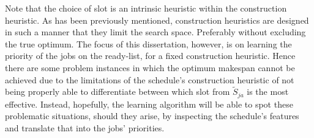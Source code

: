 \begin{comment} %
Preliminary experiments which at each time step all jobs on the ready-list are explored and dispatched according to a (fixed) construction heuristic. The job corresponding to the best resulting makespan (found via analytical methods) is chosen to have the highest priority. The resulting makespan is divided by its theoretical optimal makespan, i.e., the deviation from optimality defined by \cref{eq:ratio}. A histogram for 6-job 5-machine \jsp\ problem instances ($N=500$) is depicted in \cref{fig:slot:smallestvsfirst} using both the intrinsic heuristics: (\subref{fig:slot:first}) first slot chosen and (\subref{fig:slot:small}) slot corresponding to the smallest slot size chosen. Using always the first slot, roughly 26\% of the instances were able to achieve the optimum makespan, however mere 16\% using the smallest slot size. Hence dispatching in the first slot was favoured and will be used throughout the study.
\begin{figure}
\subfloat[First slot]{\texttt{[image: slotsize\_first.eps]}} %
\subfloat[Smallest slot size]{\texttt{[image: slotsize\_small.eps]}} %
\caption{Histogram of deviation from optimality by sequentially dispatching optimal jobs using a fixed construction heuristic.}
\label{fig:slot:smallestvsfirst}
\end{figure}
\end{comment}

Note that the choice of slot is an intrinsic heuristic within the construction heuristic. As has been previously mentioned, construction heuristics are designed in such a manner that they limit the search space. Preferably without excluding the true optimum. The focus of this dissertation, however, is on learning the priority of the jobs on the ready-list, for a fixed construction heuristic. Hence there are some problem instances in which the optimum makespan cannot be achieved due to the limitations of the schedule's construction heuristic of not being properly able to differentiate between which slot from $\tilde{S}_{ja}$ is the most effective. Instead, hopefully, the learning algorithm will be able to spot these problematic situations, should they arise, by inspecting the schedule's features and translate that into the jobs' priorities.

